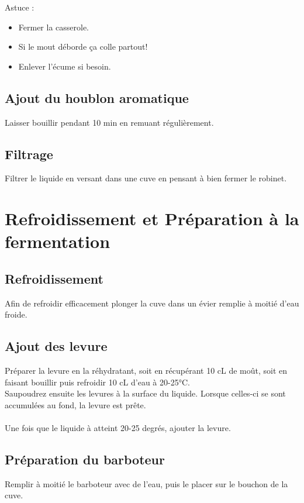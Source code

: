 \documentclass[twoside,twocolumn]{report}
\begin{document}
		Astuce : 
		\begin{itemize}
			\item Fermer la casserole.\\
			\item Si le mout déborde ça colle partout!\\
			\item Enlever l'écume si besoin.
		\end{itemize}
		\subsection{Ajout du houblon aromatique}
		Laisser bouillir pendant 10 min en  remuant régulièrement.
		\subsection{Filtrage}
		Filtrer le liquide en versant dans une cuve en pensant à bien fermer le robinet.\\
		
		\section{Refroidissement et Préparation à la fermentation}
		\subsection{Refroidissement}
		Afin de refroidir efficacement plonger la cuve dans un évier remplie à moitié d'eau froide.
		\subsection{Ajout des levure}
		Préparer la levure en la réhydratant, soit en récupérant 10 cL de moût, soit en faisant bouillir puis refroidir 10 cL d’eau à 20-25°C.\\
		Saupoudrez ensuite les levures à la surface	du liquide. Lorsque celles-ci se sont accumulées au fond, la levure est prête.\\ \\
		
		Une fois que le liquide à atteint 20-25 degrés, ajouter la levure.\\
		
		\subsection{Préparation du barboteur}
		Remplir à moitié le barboteur avec de l’eau, puis le placer sur le bouchon
		de la cuve.
		
\end{document}
